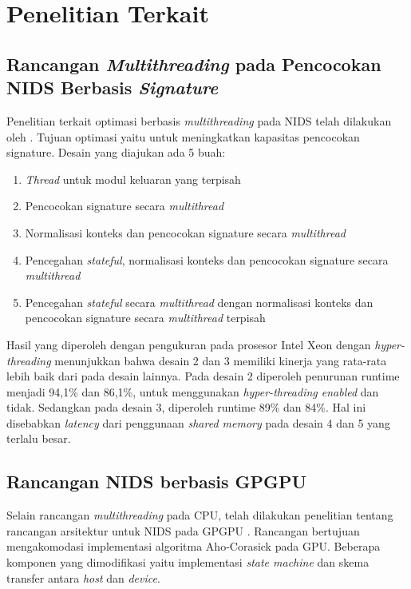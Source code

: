 \section{Penelitian Terkait}

  \subsection{Rancangan \emph{Multithreading} pada Pencocokan NIDS Berbasis \emph{Signature}} 

    Penelitian terkait optimasi berbasis \emph{multithreading} pada NIDS telah dilakukan oleh \textcite{multi2004}. Tujuan optimasi yaitu untuk meningkatkan kapasitas pencocokan signature. Desain yang diajukan ada 5 buah:

    \begin{enumerate}
      \item \emph{Thread} untuk modul keluaran yang terpisah
      \item Pencocokan signature secara \emph{multithread}
      \item Normalisasi konteks dan pencocokan signature secara \emph{multithread}
      \item Pencegahan \emph{stateful}, normalisasi konteks dan pencocokan signature secara \emph{multithread}
      \item Pencegahan \emph{stateful} secara \emph{multithread} dengan normalisasi konteks dan pencocokan signature secara \emph{multithread} terpisah
    \end{enumerate}

    Hasil yang diperoleh dengan pengukuran pada prosesor Intel Xeon dengan \emph{hyper-threading} menunjukkan bahwa desain 2 dan 3 memiliki kinerja yang rata-rata lebih baik dari pada desain lainnya. Pada desain 2 diperoleh penurunan runtime menjadi 94,1\% dan 86,1\%, untuk menggunakan \emph{hyper-threading enabled} dan tidak. Sedangkan pada desain 3, diperoleh runtime 89\% dan 84\%. Hal ini disebabkan \emph{latency} dari penggunaan \emph{shared memory} pada desain 4 dan 5 yang terlalu besar.

  \subsection{Rancangan NIDS berbasis GPGPU}

    Selain rancangan \emph{multithreading} pada CPU, telah dilakukan penelitian tentang rancangan arsitektur untuk NIDS pada GPGPU \parencite{gnort2008}. Rancangan bertujuan mengakomodasi implementasi algoritma Aho-Corasick pada GPU. Beberapa komponen yang dimodifikasi yaitu implementasi \emph{state machine} dan skema transfer antara \emph{host} dan \emph{device}.

